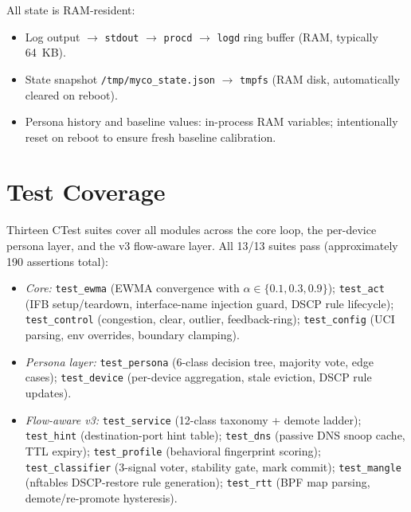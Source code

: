 All state is RAM-resident:
\begin{itemize}
  \item Log output $\to$ \texttt{stdout} $\to$ \texttt{procd} $\to$ \texttt{logd} ring buffer (RAM, typically 64~KB).
  \item State snapshot \texttt{/tmp/myco\_state.json} $\to$ \texttt{tmpfs} (RAM disk, automatically cleared on reboot).
  \item Persona history and baseline values: in-process RAM variables; intentionally reset on reboot to ensure fresh baseline calibration.
\end{itemize}

\section{Test Coverage}

Thirteen CTest suites cover all modules across the core loop, the per-device persona layer, and the v3 flow-aware layer. All 13/13 suites pass (approximately 190 assertions total):

\begin{itemize}
  \item \emph{Core:} \texttt{test\_ewma} (EWMA convergence with $\alpha \in \{0.1, 0.3, 0.9\}$); \texttt{test\_act} (IFB setup/teardown, interface-name injection guard, DSCP rule lifecycle); \texttt{test\_control} (congestion, clear, outlier, feedback-ring); \texttt{test\_config} (UCI parsing, env overrides, boundary clamping).

  \item \emph{Persona layer:} \texttt{test\_persona} (6-class decision tree, majority vote, edge cases); \texttt{test\_device} (per-device aggregation, stale eviction, DSCP rule updates).

  \item \emph{Flow-aware v3:} \texttt{test\_service} (12-class taxonomy + demote ladder); \texttt{test\_hint} (destination-port hint table); \texttt{test\_dns} (passive DNS snoop cache, TTL expiry); \texttt{test\_profile} (behavioral fingerprint scoring); \texttt{test\_classifier} (3-signal voter, stability gate, mark commit); \texttt{test\_mangle} (nftables DSCP-restore rule generation); \texttt{test\_rtt} (BPF map parsing, demote/re-promote hysteresis).
\end{itemize}
